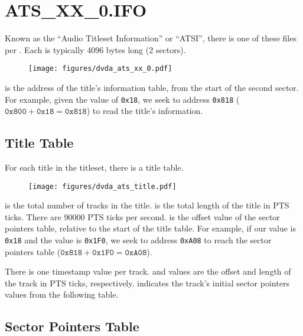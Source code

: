 \section{ATS\_XX\_0.IFO}
Known as the ``Audio Titleset Information'' or ``ATSI'',
there is one of these files per .
Each is typically 4096 bytes long (2 sectors).
\begin{figure}[h]
\texttt{[image: figures/dvda\_ats\_xx\_0.pdf]}
\end{figure}
\par
\noindent
{} is the address of the title's
information table, from the start of the second sector.
For example, given the  value of
\texttt{0x18}, we seek to address \texttt{0x818}
($\texttt{0x800} + \texttt{0x18} = \texttt{0x818}$)
to read the title's information.

\clearpage

\subsection{Title Table}
\label{dvda_title_table}
For each title in the titleset, there is a title table.

\begin{figure}[h]
\texttt{[image: figures/dvda\_ats\_title.pdf]}
\end{figure}
\par
\noindent
{} is the total number of tracks in the title.
 is the total length of the title in
PTS ticks.
There are 90000 PTS ticks per second.
 is the offset value of the
sector pointers table, relative to the start of the title table.
For example, if our  value is
\texttt{0x18} and the  value is
\texttt{0x1F0}, we seek to address \texttt{0xA08}
to reach the sector pointers table
($\texttt{0x818} + \texttt{0x1F0} = \texttt{0xA08}$).
\par
There is one timestamp value per track.
 and  values
are the offset and length of the track in PTS ticks, respectively.
 indicates the track's initial
sector pointers values from the following table.

\subsection{Sector Pointers Table}

